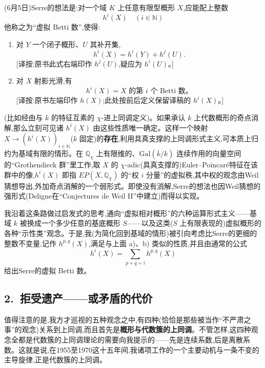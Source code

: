 \dmark{}(6月5日)Serre的想法是:对一个域 $K$ 上任意有限型概形 $X$,应能配上整数
$$h^i(X)\quad(i\in\mathbb{N})$$
他称之为“虚拟 Betti 数”,使得:
\begingroup\renewcommand{\labelenumi}{\textbf{\alph{enumi})}}
\begin{enumerate}
\item 对 $Y$ 一个闭子概形、$U$ 其补开集,
\[
h^i(X) = h^i(Y) + h^j(U).
\]
{\small [译按:原书此式右端印作 $h^j(U)$,疑应为 $h^i(U)$。]}
\item 对 $X$ 射影光滑,有
\[
h^i(X) = X\text{ 的第 }i\text{ 个 Betti 数}\text{。}
\]
{\small [译按:原书左端印作 $h(X)$;此处按前后定义保留译稿的 $h^i(X)$。]}
\end{enumerate}\endgroup
(比如经由与 $k$ 的特征互素的 $\chi$-进上同调定义)。如果承认 $k$ 上代数概形的奇点消解,那么立刻可见诸 $h^i(X)$ 由这些性质唯一确定。这样一个映射 $X\to(h^i(X))_{i\in\mathbb{N}}$($k$ 固定)的\textbf{存在},利用具真支撑的上同调形式主义,可本质上归约为基域有限的情形。在 $\mathbb{Q}_\chi$ 上有限维的、$\mathrm{Gal}(\overline{k}/k)$ 连续作用的向量空间的“Grothendieck 群”里工作,取 $X$ 的 $\chi$-adic(具真支撑的)Euler--Poincaré特征在该群中的像,$h^i(X)$ 即指 $EP(X,\mathbb{Q}_\chi)$ 的“权 $i$ 分量”的虚拟秩,其中权的观念由Weil猜想导出,外加奇点消解的一个弱形式。即使没有消解,Serre的想法也因Weil猜想的强形式(Deligne在“Conjectures de Weil II”中建立)而得以实现。

我沿着这条路做过启发式的思考,通向“虚拟相对概形”的六种运算形式主义——基域 $k$ 被换成一个多少任意的基底概形 $S$——以及这类($S$ 上有限表现的)虚拟概形的各种“示性类”观念。于是,我(为简化回到基域的情形)被引向考虑比Serre的更细的整数不变量,记作 $h^{p,q}(X)$,满足与上面 a)、b) 类似的性质,并且由通常的公式
$$h^i(X)=\sum_{p+q=i}h^{p,q}(X)$$
给出Serre的虚拟 Betti 数。

\subsection{2.~拒受遗产——或矛盾的代价}



\pmark 值得注意的是,我方才巡视的五种观念之中,有四种(恰恰是那些被当作“不严肃之事”的观念)关系到上同调,而且首先是\textbf{概形与代数簇的上同调}。不管怎样,这四种观念全都是代数簇的上同调理论的需要向我提示的——先是连续系数,后是离散系数。这就是说,在1955至1970这十五年间,我诸项工作的一个主要动机与一条不变的主导旋律,正是代数簇的上同调。

